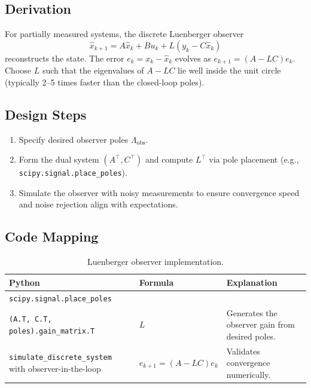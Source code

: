 \subsection{Derivation}
For partially measured systems, the discrete Luenberger observer
\[
    \hat{x}_{k+1} = A \hat{x}_k + B u_k + L (y_k - C \hat{x}_k)
\]
reconstructs the state. The error $e_k = x_k - \hat{x}_k$ evolves as $e_{k+1} = (A - L C) e_k$. Choose $L$ such that the eigenvalues of $A - L C$ lie well inside the unit circle (typically 2--5 times faster than the closed-loop poles).

\subsection{Design Steps}
\begin{enumerate}[leftmargin=*]
    \item Specify desired observer poles $\Lambda_{\text{obs}}$.
    \item Form the dual system $(A^\top, C^\top)$ and compute $L^\top$ via pole placement (e.g., \texttt{scipy.signal.place\_poles}).
    \item Simulate the observer with noisy measurements to ensure convergence speed and noise rejection align with expectations.
\end{enumerate}

\subsection{Code Mapping}
\begin{table}[h]
    \centering
    \small
    \renewcommand{\arraystretch}{1.2}
    \begin{tabularx}{\linewidth}{|>{\raggedright\arraybackslash}p{4cm}|X|X|}
        \hline
        \textbf{Python} & \textbf{Formula} & \textbf{Explanation} \\
        \hline
        \texttt{scipy.signal.place\_poles}\\\texttt{(A.T, C.T, poles).gain\_matrix.T} & $L$ & Generates the observer gain from desired poles. \\
        \hline
        \texttt{simulate\_discrete\_system} with observer-in-the-loop & $e_{k+1} = (A - L C) e_k$ & Validates convergence numerically. \\
        \hline
    \end{tabularx}
    \caption{Luenberger observer implementation.}
\end{table}

